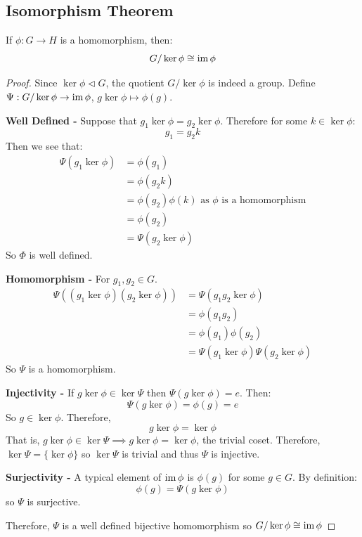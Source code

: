\documentclass[../main.tex]{subfiles}
\begin{document}
\subsection{Isomorphism Theorem}
\begin{theorem}
  If $\phi: G \to H$ is a homomorphism, then: \label{isomorphismTheorem}
  \[
    G /\ker\phi \cong \operatorname{im} \phi
  \]
\end{theorem}
\begin{proof}
  Since $\ker \phi \lhd G$, the quotient $G / \ker \phi$ is indeed a group.
  Define $\Psi: G / \ker \phi \to \operatorname{im} \phi$, $g \ker \phi \mapsto \phi(g)$.

  \textbf{Well Defined -} Suppose that $g_1 \ker \phi = g_2 \ker \phi$.
  Therefore for some $k \in \ker \phi$:
  \[
    g_1 = g_2 k
  \]
  Then we see that:
  \begin{align*}
    \Psi(g_1 \ker \phi) &= \phi(g_1) \\
                        &= \phi(g_2 k) \\
                        &= \phi(g_2)\phi(k) \text{ as $\phi$ is a homomorphism} \\
                        &= \phi(g_2) \\
                        &= \Psi(g_2 \ker \phi)
  \end{align*}
  So $\Phi$ is well defined.

  \textbf{Homomorphism -} For $g_1, g_2 \in G$.
  \begin{align*}
    \Psi((g_1 \ker \phi)(g_2 \ker \phi)) &= \Psi(g_1 g_2 \ker \phi) \\
                                         &= \phi(g_1g_2) \\
                                         &= \phi(g_1)\phi(g_2) \\
                                         &= \Psi(g_1 \ker \phi)\Psi(g_2 \ker \phi)
  \end{align*}
  So $\Psi$ is a homomorphism.

  \textbf{Injectivity -} If $g \ker \phi \in \ker \Psi$ then $\Psi(g \ker \phi) = e$.
  Then:
  \[
    \Psi(g \ker \phi) = \phi(g) = e
  \]
  So $g \in \ker \phi$.
  Therefore,
  \[
    g \ker \phi = \ker \phi
  \]
  That is, $g \ker \phi \in \ker \Psi \implies g \ker \phi = \ker \phi$, the trivial coset.
  Therefore, $\ker \Psi = \{\ker \phi\}$ so $\ker \Psi$ is trivial and thus $\Psi$ is injective.

  \textbf{Surjectivity -} A typical element of $\operatorname{im} \phi$ is $\phi(g)$ for some $g \in G$.
  By definition:
  \[
    \phi(g) = \Psi(g \ker \phi)
  \]
  so $\Psi$ is surjective.

  Therefore, $\Psi$ is a well defined bijective homomorphism so $G / \ker \phi \cong \operatorname{im} \phi$
\end{proof}
\end{document}
